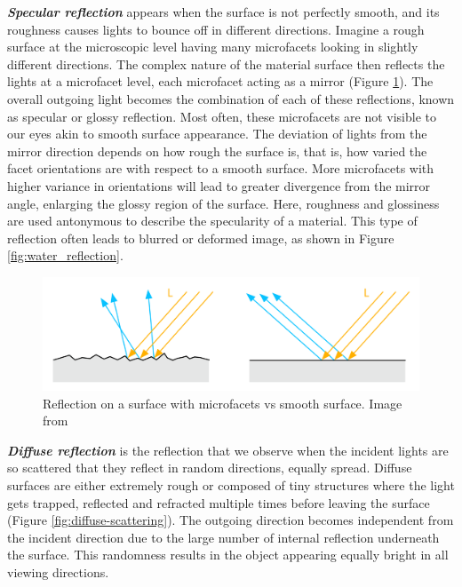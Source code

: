\textbf{\textit{Specular reflection}} appears when the surface is not perfectly smooth, and its roughness causes lights to bounce off in different directions. Imagine a rough surface at the microscopic level having many microfacets looking in slightly different directions. The complex nature of the material surface then reflects the lights at a microfacet level, each microfacet acting as a mirror (Figure \ref{fig:microfacet}). The overall outgoing light becomes the combination of each of these reflections, known as specular or glossy reflection. Most often, these microfacets are not visible to our eyes akin to smooth surface appearance. The deviation of lights from the mirror direction depends on how rough the surface is, that is, how varied the facet orientations are with respect to a smooth surface. More microfacets with higher variance in orientations will lead to greater divergence from the mirror angle, enlarging the glossy region of the surface. Here, roughness and glossiness are used antonymous to describe the specularity of a material. This type of reflection often leads to blurred or deformed image, as shown in Figure \ref{fig:water_reflection}. 



\begin{figure}
\includegraphics[width=0.9\linewidth]{Images/diagram_microfacet.png}
\caption{Reflection on a surface with microfacets vs smooth surface. Image from \citeauthor{googlePhysicallyBased} \cite{googlePhysicallyBased}}\label{fig:microfacet}
    
\end{figure} 




\textbf{\textit{Diffuse reflection}} is the reflection that we observe when the incident lights are so scattered that they reflect in random directions, equally spread. Diffuse surfaces are either extremely rough or composed of tiny structures where the light gets trapped, reflected and refracted multiple times before leaving the surface (Figure \ref{fig:diffuse-scattering}). The outgoing direction becomes independent from the incident direction due to the large number of internal reflection underneath the surface. This randomness results in the object appearing equally bright in all viewing directions. 

